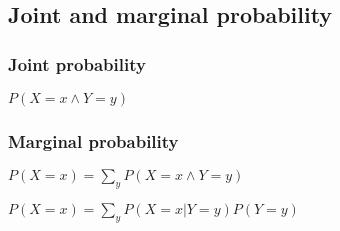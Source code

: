 
\subsection{Joint and marginal probability}

\subsubsection{Joint probability}

\(P(X=x\land Y=y)\)

\subsubsection{ Marginal probability}

$P(X=x)=\sum_{y}P(X=x\land Y=y)$

$P(X=x)=\sum_{y}P(X=x|Y=y)P(Y=y)$


